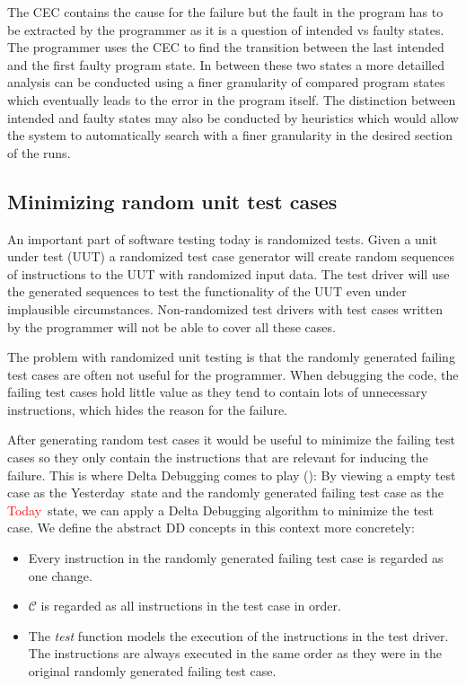 \documentclass[a4paper,UKenglish]{lipics-v2018}
\newcommand{\green}[1]{\textcolor{td-green}{#1}}
\newcommand{\red}[1]{\textcolor{red}{#1}}
\newcommand{\yd}[0]{\green{Yesterday}}
\newcommand{\td}[0]{\red{Today}}
\newcommand{\C}[0]{\ensuremath{\mathcal{C}}}
\begin{document}
The CEC contains the cause for the failure but the fault in the program has to be extracted by the programmer as it is a question of intended vs faulty states. The programmer uses the CEC to find the transition between the last intended and the first faulty program state. In between these two states a more detailled analysis can be conducted using a finer granularity of compared program states which eventually leads to the error in the program itself. The distinction between intended and faulty states may also be conducted by heuristics which would allow the system to automatically search with a finer granularity in the desired section of the runs.



\subsection{Minimizing random unit test cases}

An important part of software testing today is randomized tests. Given a unit under test (UUT) a randomized test case generator will create random sequences of instructions to the UUT with randomized input data. The test driver will use the generated sequences to test the functionality of the UUT even under implausible circumstances. Non-randomized test drivers with test cases written by the programmer will not be able to cover all these cases.

The problem with randomized unit testing is that the randomly generated failing test cases are often not useful for the programmer. When debugging the code, the failing test cases hold little value as they tend to contain lots of unnecessary instructions, which hides the reason for the failure. 

After generating random test cases it would be useful to minimize the failing test cases so they only contain the instructions that are relevant for inducing the failure. This is where Delta Debugging comes to play (\cite{Lei:2005:MRU:1104997.1105255}): By viewing a empty test case as the \yd\ state and the randomly generated failing test case as the \td\ state, we can apply a Delta Debugging algorithm to minimize the test case. We define the abstract DD concepts in this context more concretely:

\begin{itemize}
	\item Every instruction in the randomly generated failing test case is regarded as one change.
	\item $\C$ is regarded as all instructions in the test case in order.
	\item The \textit{test} function models the execution of the instructions in the test driver. The instructions are always executed in the same order as they were in the original randomly generated failing test case. 
\end{itemize}
\end{document}
